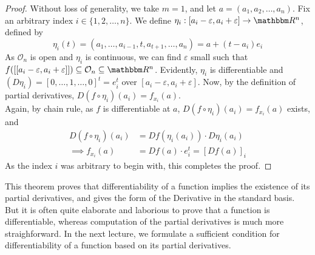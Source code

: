 \documentclass[../Analysis-3]{subfiles}
\begin{document}
\begin{proof}
  Without loss of generality, we take $m = 1$, and let $a = (a_1, a_2, \dots, a_n)$. Fix an arbitrary index $i \in \{1,2,\dots,n \}$. We define $\eta_i : [a_i - \varepsilon,a_i + \varepsilon] \to \R^n$, defined by 
  \[\eta_i(t) = (a_1, \dots, a_{i-1}, t, a_{t+1}, \dots, a_n) = a + (t-a_i)e_i \]
  As $\mathcal{O}_n$ is open and $\eta_i$ is continuous, we can find $\varepsilon$ small such that $f([[a_i - \varepsilon,a_i + \varepsilon]]) \subseteq \mathcal{O}_n \subseteq \R^n$. Evidently, $\eta_i$ is differentiable and $(D\eta_i) = [0,\dots,1,\dots,0]^t = e_i^t$ over $[a_i - \varepsilon,a_i + \varepsilon]$. Now, by the definition of partial derivatives, \(D(f\circ\eta_i)(a_i) = f_{x_i} (a)\).\\
  Again, by chain rule, as $f$ is differentiable at $a$, $D(f\circ\eta_i)(a_i) = f_{x_i}(a)$ exists, and 
  \begin{align*}
      D(f\circ\eta_i)(a_i) &= Df(\eta_i(a_i)) \cdot D\eta_i (a_i)\\
      \implies f_{x_i} (a) &= Df(a) \cdot e_i^t = [Df(a)]_i
  \end{align*}
  As the index $i$ was arbitrary to begin with, this completes the proof.

\end{proof}

This theorem proves that differentiability of a function implies the existence of its partial derivatives, and gives the form of the Derivative in the standard basis. But it is often quite elaborate and laborious to prove that a function is differentiable, whereas computation of the partial derivatives is much more straighforward. In the next lecture, we formulate a sufficient condition for differentiability of a function based on its partial derivatives.
\end{document}
